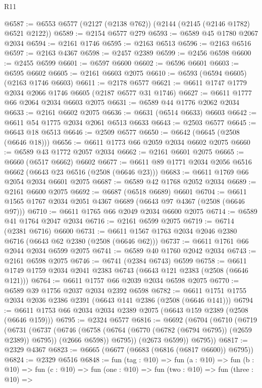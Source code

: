 \begin{lexlean}{R11}
\begin{coremodule}
@6587 := @6553 @6577 (@2127 (@2138 @762)) (@2144 (@2145 (@2146 @1782) @6521 @2122))
@6589 := @2154 @6577 @279
@6593 := @6589 @45 @1780 @2067 @2034
@6594 := @2161 @1746
@6595 := @2163 @6513
@6596 := @2163 @6516
@6597 := @2163 @4367
@6598 := @2457 @2389
@6599 := @2456 @6598
@6600 := @2455 @6599
@6601 := @6597 @6600
@6602 := @6596 @6601
@6603 := @6595 @6602
@6605 := @2161 @6603 @2075
@6610 := @6593 (@6594 @6605) (@2163 @1746 @6603)
@6611 := @2178 @6577
@6621 := @6611 @1747 @1779 @2034 @2066 @1746 @6605 (@2187 @6577 @31 @1746)
@6627 := @6611 @1777 @66 @2064 @2034 @6603 @2075
@6631 := @6589 @44 @1776 @2062 @2034
@6633 := @2161 @6602 @2075
@6636 := @6631 (@6514 @6633) @6603
@6642 := @6611 @54 @1775 @2034 @2061 @6513 @6633
@6643 := @2503 @6577
@6645 := @6643 @18 @6513
@6646 := @2509 @6577
@6650 := @6642 (@6645 (@2508 (@6646 @18)))
@6656 := @6611 @1773 @66 @2059 @2034 @6602 @2075
@6660 := @6589 @43 @1772 @2057 @2034
@6662 := @2161 @6601 @2075
@6665 := @6660 (@6517 @6662) @6602
@6677 := @6611 @89 @1771 @2034 @2056 @6516 @6662 (@6643 @23 @6516 (@2508 (@6646 @23)))
@6683 := @6611 @1769 @66 @2054 @2034 @6601 @2075
@6687 := @6589 @42 @1768 @2052 @2034
@6689 := @2161 @6600 @2075
@6692 := @6687 (@6518 @6689) @6601
@6704 := @6611 @1565 @1767 @2034 @2051 @4367 @6689 (@6643 @97 @4367 (@2508 (@6646 @97)))
@6710 := @6611 @1765 @66 @2049 @2034 @6600 @2075
@6714 := @6589 @41 @1764 @2047 @2034
@6716 := @2161 @6599 @2075
@6719 := @6714 (@2381 @6716) @6600
@6731 := @6611 @1567 @1763 @2034 @2046 @2380 @6716 (@6643 @62 @2380 (@2508 (@6646 @62)))
@6737 := @6611 @1761 @66 @2044 @2034 @6599 @2075
@6741 := @6589 @40 @1760 @2042 @2034
@6743 := @2161 @6598 @2075
@6746 := @6741 (@2384 @6743) @6599
@6758 := @6611 @1749 @1759 @2034 @2041 @2383 @6743 (@6643 @121 @2383 (@2508 (@6646 @121)))
@6764 := @6611 @1757 @66 @2039 @2034 @6598 @2075
@6770 := @6589 @39 @1756 @2037 @2034 @2392 @6598
@6782 := @6611 @1751 @1755 @2034 @2036 @2386 @2391 (@6643 @141 @2386 (@2508 (@6646 @141)))
@6794 := @6611 @1753 @66 @2034 @2034 @2389 @2075 (@6643 @159 @2389 (@2508 (@6646 @159)))
@6795 := @2324 @6577
@6816 := @6692
    (@6704
      (@6710
        (@6719
          (@6731
            (@6737
              (@6746
                (@6758 (@6764 (@6770 (@6782 (@6794 @6795)) (@2659 @2389)) @6795))
                (@2666 @6598))
              @6795))
          (@2673 @6599))
        @6795))
@6817 := @2329 @4367
@6823 := @6665 (@6677 (@6683 (@6816 (@6817 @6600)) @6795))
@6824 := @2329 @6516
@6848 := fun (tag : @10) =>
  fun (a : @10) =>
  fun (b : @10) =>
  fun (c : @10) =>
  fun (one : @10) =>
  fun (two : @10) =>
  fun (three : @10) =>

\end{coremodule}
\end{lexlean}
